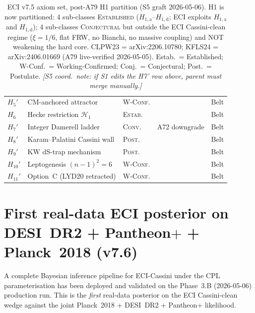 \documentclass[a4paper,11pt]{article}
\theoremstyle{definition}
\theoremstyle{remark}
\begin{document}
\begin{table}[ht]
\begin{tabular}{lllll}
$H_5'$ & CM-anchored attractor & \textsc{W-Conf.} & & Belt \\
$H_6$ & Hecke restriction $\mathcal{H}_1$ & \textsc{Estab.} & & Belt \\
$H_7'$ & Integer Damerell ladder & \textsc{Conv.} & A72 downgrade & Belt \\
$H_8'$ & Karam--Palatini Cassini wall & \textsc{Post.} & & Belt \\
$H_9'$ & KW dS-trap mechanism & \textsc{Post.} & & Belt \\
$H_{10}'$ & Leptogenesis $(n{-}1)^2{=}6$ & \textsc{W-Conf.} & & Belt \\
$H_{11}'$ & Option~C (LYD20 retracted) & \textsc{W-Conf.} & & Belt \\
\bottomrule
\end{tabular}
\caption{ECI v7.5 axiom set, post-A79 H1 partition (S5 graft 2026-05-06).
H1 is now partitioned: 4 sub-classes \textsc{Established}
($H_{1,\mathrm{a}}$--$H_{1,\mathrm{d}}$; ECI exploits $H_{1,\mathrm{a}}$
and $H_{1,\mathrm{d}}$); 4 sub-classes \textsc{Conjectural} but outside
the ECI Cassini-clean regime ($\xi=1/6$, flat FRW, no Bianchi, no massive
coupling) and NOT weakening the hard core.
CLPW23 = arXiv:2206.10780; KFLS24 = arXiv:2406.01669 (A79 live-verified
2026-05-05).  Estab.\ = Established; W-Conf.\ = Working-Confirmed;
Conj.\ = Conjectural; Post.\ = Postulate.
\emph{[S5 coord.\ note: if S1 edits the H7' row above, parent must
merge manually.]}}
\label{tab:axioms-lakatos}
\end{table}

\section{First real-data ECI posterior on DESI~DR2 + Pantheon$+$ + Planck~2018 (v7.6)}
\label{sec:eci-real}

A complete Bayesian inference pipeline for ECI-Cassini under the CPL
parameterisation has been deployed and validated on the Phase~3.B
(2026-05-06) production run.  This is the \emph{first} real-data
posterior on the ECI Cassini-clean wedge against the joint
Planck~2018 + DESI~DR2 + Pantheon$+$ likelihood.
\end{document}
